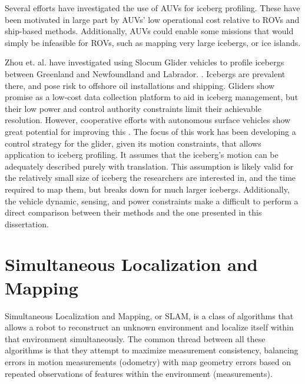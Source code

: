 Several efforts have investigated the use of AUVs for iceberg profiling. These have been motivated in large part by AUVs' low operational cost relative to ROVs and ship-based methods. Additionally, AUVs could enable some missions that would simply be infeasible for ROVs, such as mapping very large icebergs, or ice islands. 

Zhou et. al. have investigated using Slocum Glider vehicles to profile icebergs between Greenland and Newfoundland and Labrador. \cite{Zhou2014}. Icebergs are prevalent there, and pose risk to offshore oil installations and shipping. Gliders show promise as a low-cost data collection platform to aid in iceberg management, but their low power and control authority constraints limit their achievable resolution. However, cooperative efforts with autonomous surface vehicles show great potential for improving this \cite{Smith2014}. The focus of this work has been developing a control strategy for the glider, given its motion constraints, that allows application to iceberg profiling. It assumes that the iceberg's motion can be adequately described purely with translation. This assumption is likely valid for the relatively small size of iceberg the researchers are interested in, and the time required to map them, but breaks down for much larger icebergs. Additionally, the vehicle dynamic, sensing, and power constraints make a difficult to perform a direct comparison between their methods and the one presented in this dissertation. 




\section{Simultaneous Localization and Mapping}

Simultaneous Localization and Mapping, or SLAM, is a class of algorithms that allows a robot to reconstruct an unknown environment and localize itself within that environment simultaneously.  The common thread between all these algorithms is that they attempt to maximize measurement consistency, balancing errors in motion measurements (odometry) with map geometry errors based on repeated observations of features within the environment (measurements).

